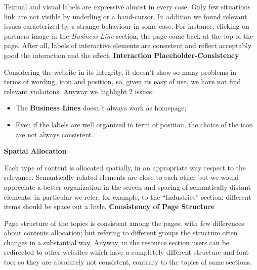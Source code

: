 Textual and visual labels are expressive almost in every case. Only few situations link are not visible by underling or a hand-cursor. In addition we found relevant issues caracterized by a strange behaviour in some case. For instance, clicking on partners image in the \textit{Business Line} section, the page come back at the top of the page. 
After all, labels of interactive elements are consistent and reflect acceptably good the interaction and the effect.
\medskip
\textbf{Interaction Placeholder-Consistency}\par
Considering the website in its integrity, it doesn’t show so many problems in terms of wording, icon and position, so, given its easy of use, we have not find relevant violaitons. 
Anyway we highlight 2 issues:
\begin{itemize}
\item The \textbf{Business Lines} doesn’t always work as homepage;
\item Even if the labels are well organized in term of position, the choice of the icon are not always consistent.
\end{itemize}
\medskip
\textbf{Spatial Allocation}\par
Each type of content is allocated spatially, in an appropriate way respect to the relevance. Semantically related elements are close to each other but we would appreciate a better organization in the screen and spacing of semantically distant elements; in particular we refer, for example, to the “Industries” section: different items should be space out a little. 
\medskip
\textbf{Consistency of Page Structure}\par
Page structure of the topics is consistent among the pages, with few differences about contents allocation; but refering to different groups the structure often changes in a substantial way.
Anyway, in the resource section users can be redirected to other websites which have a completely different structure and font too; so they are absolutely not consistent, contrary to the topics of same sections.
\bigskip
